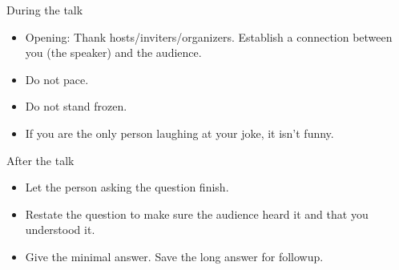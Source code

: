 During the talk
\begin{itemize}
    \item Opening: Thank hosts/inviters/organizers. Establish a connection between you (the speaker) and the audience.
    \item Do not pace.
    \item Do not stand frozen.
    \item If you are the only person laughing at your joke, it isn't funny.
\end{itemize}
 
After the talk
\begin{itemize}
    \item Let the person asking the question finish.
    \item Restate the question to make sure the audience heard it and that you understood it.
    \item Give the minimal answer. Save the long answer for followup.
\end{itemize}

